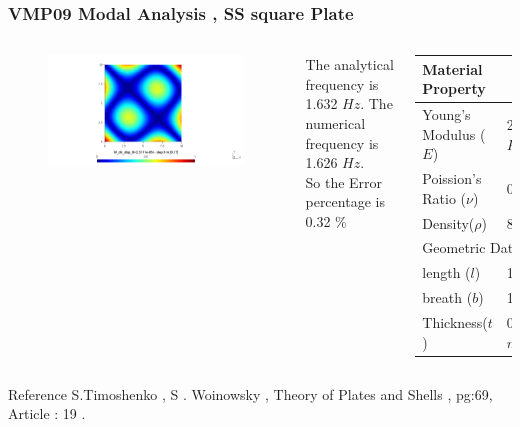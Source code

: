 \documentclass[9pt]{beamer}
\begin{document}
\begin{frame}
\frametitle{VMP09 Modal Analysis , SS square Plate}

\begin{columns}

\begin{figure}[h!]
\centering
{}%
  \includegraphics[width=\linewidth,trim={8cm 4cm 8cm 2cm},clip]{VMP09_T12_pos_F9.png}
\endminipage
\end{figure}

The analytical frequency is 1.632 $Hz$. 
The numerical frequency is  1.626 $Hz$. \\
So the Error percentage is  0.32 $\%$ 



\begin{table}[ht]
\renewcommand{\arraystretch}{1.5}
\centering
\begin{tabular}{ll}
\hline
\multicolumn{2}{l}{Material Property} \\ \hline  \hline
Young's Modulus ($E$)          &25E11 $Pa$        \\
Poission's Ratio ($\nu$)       & 0.3            \\ 
Density($\rho$)       &     8000         \\ 
    \hline
    \multicolumn{2}{l}{Geometric Data} \\ \hline  \hline
            length ($l$)        & 10 $m$   \\
            breath ($b$)        & 10 $m$   \\
            Thickness($t$)     &         0.01 $m$  \\
             \hline
\end{tabular}
\end{table}

\end{columns}



\begin{block}{Reference}
S.Timoshenko , S . Woinowsky , Theory of Plates and Shells , pg:69, Article : 19 . 
\end{block}

\end{frame}
\end{document}
